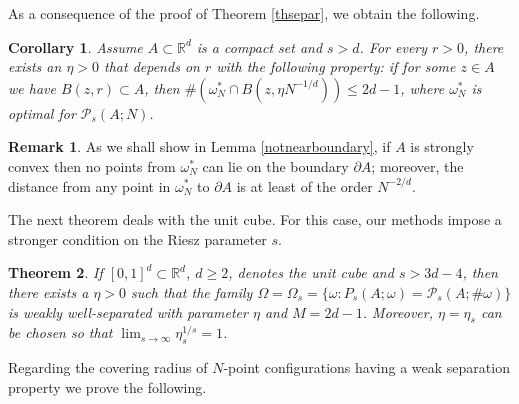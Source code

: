 \documentclass[12pt]{amsart}
\newtheorem{theorem}{Theorem}[section]
\newtheorem{corollary}[theorem]{Corollary}
\theoremstyle{definition}
\newtheorem*{rem*}{Remark}
\def\R{\mathbb{R}}
\newcommand{\1}{\mathbf{1}}
\newcommand{\PP}{\mathcal{P}}
\begin{document}
As a consequence of the proof of Theorem \ref{thsepar}, we obtain the following.
\begin{corollary}
Assume $A\subset \R^d$ is a compact set and $s>d$. For every $r>0$, there exists an $\eta>0$ that depends on $r$ with the following property: if for some $z\in A$ we have $B(z,r)\subset A$, then $\#(\omega^*_N \cap B(z, \eta N^{-1/d}))\leqslant 2d-1$, where $\omega_N^*$ is optimal for $\PP_s(A; N)$.
\end{corollary}
\begin{rem*}
As we shall show in Lemma \ref{notnearboundary}, if $A$ is strongly convex then no points from $\omega_N^*$ can lie on the boundary $\partial A$; moreover, the distance from any point in $\omega_N^*$ to $\partial A$ is at least of the order $N^{-2/d}$. 
\end{rem*}
The next theorem deals with the unit cube. For this case, our methods impose a stronger condition on the Riesz parameter $s$.
\begin{theorem}\label{thseparcube}
If $[0,1]^d\subset \R^d$, $d\geqslant 2$, denotes the unit cube and $s>3d-4$, then there exists a $\eta>0$ such that the family $\Omega=\Omega_s=\{\omega\colon P_s(A; \omega)=\PP_s(A; \#\omega)\}$ is weakly well-separated with parameter $\eta$ and $M=2d-1$.
Moreover, $\eta=\eta_s$ can be chosen so that $\lim_{s\to \infty} \eta_s^{1/s}=1$.
\end{theorem}

Regarding the covering radius of $N$-point configurations having a weak separation property we prove the following.
\end{document}
